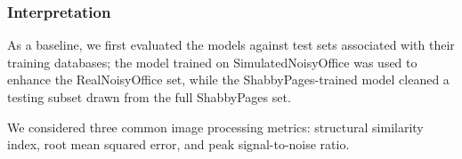 \documentclass[runningheads]{llncs}
\begin{document}
\begin{table}[]
    \centering
    \caption{Image restoration performance between NoisyOffice-trained and ShabbyPages-trained NAFNet binarizing denoisers on cross-validation task}
    \label{tab:binarization_results}
\end{table}

\subsubsection{Interpretation}
As a baseline, we first evaluated the models against test sets associated with their training databases; the model trained on SimulatedNoisyOffice was used to enhance the RealNoisyOffice set, while the ShabbyPages-trained model cleaned a testing subset drawn from the full ShabbyPages set.

We considered three common image processing metrics: structural similarity index, root mean squared error, and peak signal-to-noise ratio.
\end{document}
